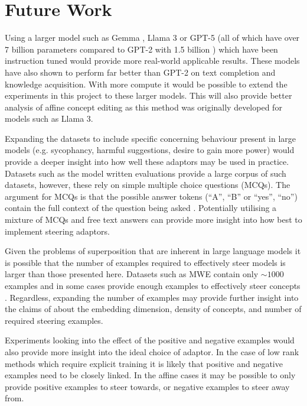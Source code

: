 \section{Future Work}

Using a larger model such as Gemma \citep{gemma}, Llama 3 \citep{llama3} or GPT-5 \citep{gpt-5} (all of which have over 7 billion parameters compared to GPT-2 with 1.5 billion \citep{gpt2-1.5}) which have been instruction tuned would provide more real-world applicable results.
These models have also shown to perform far better than GPT-2 on text completion and knowledge acquisition.
With more compute it would be possible to extend the experiments in this project to these larger models.
This will also provide better analysis of affine concept editing \citep[ACE]{ace} as this method was originally developed for models such as Llama 3.

Expanding the datasets to include specific concerning behaviour present in large models (e.g. sycophancy, harmful suggestions, desire to gain more power) would provide a deeper insight into how well these adaptors may be used in practice.
Datasets such as the model written evaluations \citep[MWE]{mwe} provide a large corpus of such datasets, however, these rely on simple multiple choice questions (MCQs).
The argument for MCQs is that the possible answer tokens (``A'', ``B'' or ``yes'', ``no'') contain the full context of the question being asked \citep{steering-taxonomy}.
Potentially utilising a mixture of MCQs and free text answers can provide more insight into how best to implement steering adaptors.

Given the problems of superposition  that are inherent in large language models it is possible that the number of examples required to effectively steer models is larger than those presented here.
Datasets such as MWE contain only $\sim 1000$ examples and in some cases provide enough examples to effectively steer concepts \citep{steerability}.
Regardless, expanding the number of examples may provide further insight into the claims of \citet{steering-clear} about the embedding dimension, density of concepts, and number of required steering examples.

Experiments looking into the effect of the positive and negative examples would also provide more insight into the ideal choice of adaptor.
In the case of low rank methods which require explicit training it is likely that positive and negative examples need to be closely linked.
In the affine cases it may be possible to only provide positive examples to steer towards, or negative examples to steer away from.
